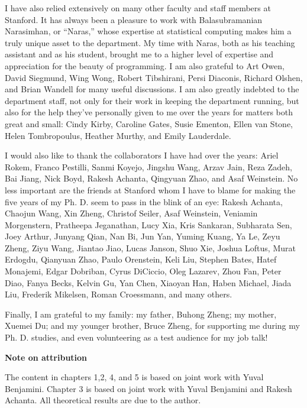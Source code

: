 \documentclass[12pt]{report}
\begin{document}
I have also relied extensively on many other faculty and staff members
at Stanford.  It has always been a pleasure to work with
Balasubramanian Narasimhan, or ``Naras,'' whose expertise at
statistical computing makes him a truly unique asset to the
department.  My time with Naras, both as his teaching assistant and as
his student, brought me to a higher level of expertise and
appreciation for the beauty of programming.  I am also grateful to Art
Owen, David Siegmund, Wing Wong, Robert Tibshirani, Persi Diaconis,
Richard Olshen, and Brian Wandell for many useful discussions.  I am
also greatly indebted to the department staff, not only for their work
in keeping the department running, but also for the help they've
personally given to me over the years for matters both great and
small: Cindy Kirby, Caroline Gates, Susie Ementon, Ellen van Stone,
Helen Tombropoulus, Heather Murthy, and Emily Lauderdale.

I would also like to thank the collaborators I have had over the
years: Ariel Rokem, Franco Pestilli, Sanmi Koyejo, Jingshu Wang, Arzav
Jain, Reza Zadeh, Bai Jiang, Nick Boyd, Rakesh Achanta, Qingyuan Zhao,
and Asaf Weinstein.  No less important are the friends at Stanford
whom I have to blame for making the five years of my Ph. D. seem to
pass in the blink of an eye: Rakesh Achanta, Chaojun Wang, Xin Zheng,
Christof Seiler, Asaf Weinstein, Veniamin Morgenstern, Pratheepa
Jeganathan, Lucy Xia, Kris Sankaran, Subharata Sen, Joey Arthur,
Junyang Qian, Nan Bi, Jun Yan, Yuming Kuang, Ya Le, Zeyu Zheng, Ziyu
Wang, Jiantao Jiao, Lucas Janson, Shuo Xie, Joshua Loftus, Murat
Erdogdu, Qianyuan Zhao, Paulo Orenstein, Keli Liu, Stephen Bates,
Hatef Monajemi, Edgar Dobriban, Cyrus DiCiccio, Oleg Lazarev, Zhou
Fan, Peter Diao, Fanya Becks, Kelvin Gu, Yan Chen, Xiaoyan Han, Haben
Michael, Jiada Liu, Frederik Mikelsen, Roman Croessmann, and many
others.

Finally, I am grateful to my family: my father, Buhong Zheng; my
mother, Xuemei Du; and my younger brother, Bruce Zheng, for supporting
me during my Ph. D. studies, and even volunteering as a test audience
for my job talk!
\newline

\noindent\textbf{Note on attribution}

The content in chapters 1,2, 4, and 5 is based on joint work with
Yuval Benjamini.  Chapter 3 is based on joint work with Yuval
Benjamini and Rakesh Achanta.  All theoretical results are due to the
author.

    \afterpreface
\end{document}
